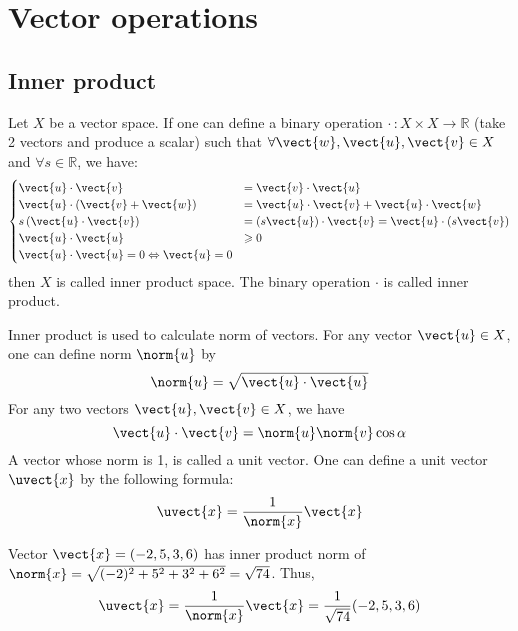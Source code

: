 \section{Vector operations}
\subsection{Inner product}
Let $X$ be a vector space. If one can define a binary operation $\cdot \, : X \times X \rightarrow \mathbb{R}$ (take 2 vectors and produce a scalar) such that $\forall \vect{w},\vect{u},\vect{v}\in X$ and $\forall s\in \mathbb{R}$, we have:
\begin{equation*}
\begin{cases}
    \vect{u} \cdot \vect{v} &= \vect{v} \cdot \vect{u} \\
    \vect{u} \cdot \left( \vect{v}+\vect{w} \right) &= \vect{u} \cdot \vect{v} + \vect{u} \cdot \vect{w} \\
    s\left( \vect{u} \cdot \vect{v} \right) &= \left( s\vect{u} \right)\cdot \vect{v}=\vect{u} \cdot \left( s\vect{v} \right) \\
    \vect{u} \cdot \vect{u} & \geqslant 0 \\
    \vect{u} \cdot \vect{u} = 0 \Leftrightarrow \vect{u}=0
\end{cases}
\end{equation*}
then $X$ is called inner product space. The binary operation $\cdot$ is called inner product.\par 
Inner product is used to calculate norm of vectors. For any vector $\vect{u}\in X$, one can define norm $\norm{u}$ by \[ \norm{u}=\sqrt{\vect{u} \cdot \vect{u}} \]
For any two vectors $\vect{u},\vect{v}\in X$, we have \[ \vect{u} \cdot \vect{v} = \norm{u}\norm{v}\cos \alpha \]
A vector whose norm is 1, is called a unit vector. One can define a unit vector $\uvect{x}$ by the following formula: \[ \uvect{x}=\frac{1}{\norm{x}}\vect{x} \]
\begin{example}
Vector $\vect{x}=(-2,5,3,6)$ has inner product norm of $\norm{x}=\sqrt{(-2)^2+5^2+3^2+6^2}=\sqrt{74}$. Thus, \[ \uvect{x}=\frac{1}{\norm{x}}\vect{x}=\frac{1}{\sqrt{74}} (-2,5,3,6) \]
\end{example}
